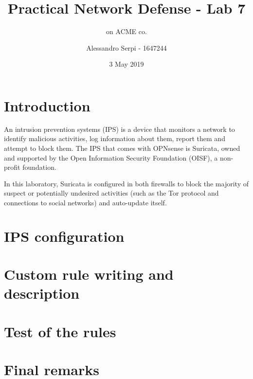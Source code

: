 \documentclass[draft]{homework}
\title{Practical Network Defense - Lab 7}
\subtitle{\suri on ACME co.}
\author{Alessandro Serpi - 1647244}
\date{3 May 2019}
\newcommand{\opn}{OPNsense\xspace}
\newcommand{\suri}{Suricata\xspace}
\begin{document}
    \maketitle
    \tableofcontents
    
    
    \pagebreak
    \section{Introduction}
    An intrusion prevention systems (IPS) is a device that monitors a network to identify malicious activities, log information about them, report them and attempt to block them.
    The IPS that comes with \opn is \suri, owned and supported by the Open Information Security Foundation (OISF), a non-profit foundation.
    
    In this laboratory, \suri is configured in both firewalls to block the majority of suspect or potentially undesired activities (such as the Tor protocol and connections to social networks) and auto-update itself.
    
    
    \section{IPS configuration}
    
    
    \section{Custom rule writing and description}
    
    
    \section{Test of the rules}
    
    
    \section{Final remarks}
\end{document}
